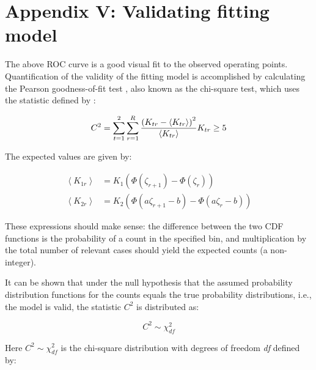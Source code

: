 \documentclass[
]{book}
\begin{document}
\hypertarget{binormal-model-curve-fitting-validation-appendix-5}{%
\section{Appendix V: Validating fitting model}\label{binormal-model-curve-fitting-validation-appendix-5}}

The above ROC curve is a good visual fit to the observed operating points. Quantification of the validity of the fitting model is accomplished by calculating the Pearson goodness-of-fit test \citep{RN2656}, also known as the chi-square test, which uses the statistic defined by \citep{RN1492}:

\begin{equation} 
C^2=\sum_{t=1}^{2}\sum_{r=1}^{R}\frac{\left (K_{tr}-\left \langle K_{tr} \right \rangle  \right )^2}{\left \langle K_{tr} \right \rangle}\\
K_{tr} \geq 5
\label{eq:binormal-modelGoodnessFit}
\end{equation}

The expected values are given by:

\begin{equation}
\begin{split}
\left \langle K_{1r} \right \rangle &=K_1\left ( \Phi\left ( \zeta_{r+1} \right ) - \Phi\left ( \zeta_r \right )  \right ) \\
\left \langle K_{2r} \right \rangle &=K_2\left ( \Phi\left ( a\zeta_{r+1}-b \right ) - \Phi\left ( a\zeta_r - b\right )  \right )
\end{split}
\label{eq:binormal-modelGoodnessFitExpVals}
\end{equation}

These expressions should make sense: the difference between the two CDF functions is the probability of a count in the specified bin, and multiplication by the total number of relevant cases should yield the expected counts (a non-integer).

It can be shown that under the null hypothesis that the assumed probability distribution functions for the counts equals the true probability distributions, i.e., the model is valid, the statistic \(C^2\) is distributed as:

\begin{equation} 
C^2\sim \chi_{df}^{2}
\label{eq:binormal-modelGoodnessFitDistr}
\end{equation}

Here \(C^2\sim \chi_{df}^{2}\) is the chi-square distribution with degrees of freedom \emph{df} defined by:
\end{document}
